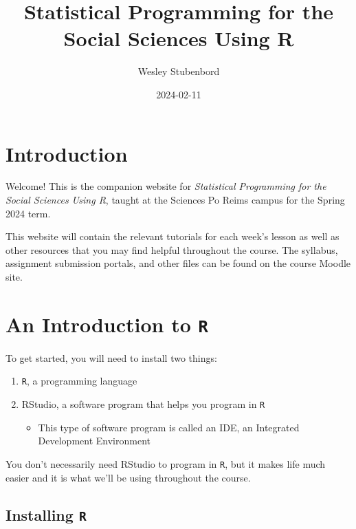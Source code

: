 \documentclass[
]{book}
\title{Statistical Programming for the Social Sciences Using R}
\author{Wesley Stubenbord}
\date{2024-02-11}
\providecommand{\tightlist}{%
  \setlength{\itemsep}{0pt}\setlength{\parskip}{0pt}}
\begin{document}
\maketitle

{
\setcounter{tocdepth}{1}
\tableofcontents
}
\hypertarget{introduction}{%
\chapter*{Introduction}\label{introduction}}

Welcome! This is the companion website for \emph{Statistical Programming for the Social Sciences Using R}, taught at the Sciences Po Reims campus for the Spring 2024 term.

This website will contain the relevant tutorials for each week's lesson as well as other resources that you may find helpful throughout the course. The syllabus, assignment submission portals, and other files can be found on the course Moodle site.

\hypertarget{an-introduction-to-r}{%
\chapter{\texorpdfstring{An Introduction to \texttt{R}}{An Introduction to R}}\label{an-introduction-to-r}}

To get started, you will need to install two things:

\begin{enumerate}
\def\labelenumi{\arabic{enumi}.}
\item
  \texttt{R}, a programming language
\item
  RStudio, a software program that helps you program in \texttt{R}

  \begin{itemize}
  \tightlist
  \item
    This type of software program is called an IDE, an Integrated Development Environment
  \end{itemize}
\end{enumerate}

You don't necessarily need RStudio to program in \texttt{R}, but it makes life much easier and it is what we'll be using throughout the course.

\hypertarget{installing-r}{%
\section{\texorpdfstring{Installing \texttt{R}}{Installing R}}\label{installing-r}}
\end{document}
